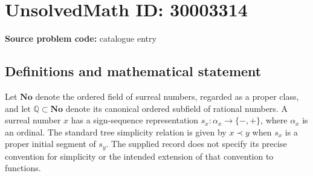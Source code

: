 \documentclass[11pt]{article}
\newcommand{\Q}{\mathbb{Q}}
\begin{document}
\section*{UnsolvedMath ID: 30003314}
\textbf{Source problem code:} catalogue entry
\subsection{Definitions and mathematical statement}
Let \(\mathbf{No}\) denote the ordered field of surreal numbers, regarded as a proper class, and let \(\Q\subset\mathbf{No}\) denote its canonical ordered subfield of rational numbers. A surreal number \(x\) has a sign-sequence representation \(s_x\colon\alpha_x\to\{-,+\}\), where \(\alpha_x\) is an ordinal. The standard tree simplicity relation is given by \(x\prec y\) when \(s_x\) is a proper initial segment of \(s_y\). The supplied record does not specify its precise convention for simplicity or the intended extension of that convention to functions.
\end{document}
